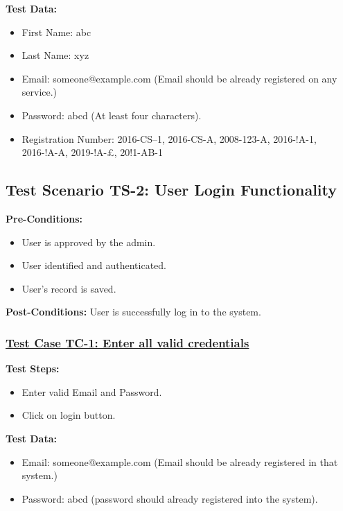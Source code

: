 \textbf{Test Data:}
\begin{itemize}

\item First Name: abc
\item Last Name: xyz
\item Email: someone@example.com (Email should be already registered on any service.)
\item Password: abcd (At least four characters).
\item Registration Number: 2016-CS--1, 2016-CS-A, 2008-123-A, 2016-!A-1, 2016-!A-A, 2019-!A-£, 20!1-AB-1

\end{itemize}


\subsection{Test Scenario TS-2: User Login Functionality}
\textbf{Pre-Conditions: } 
\begin{itemize}

\item User is approved by the admin.
\item User identified and authenticated.
\item User's record is saved.

\end{itemize}

\textbf{Post-Conditions: } User is successfully log in to the system.
\subsubsection{\underline{Test Case TC-1: Enter all valid credentials}}
\textbf{Test Steps:}
\begin{itemize}

\item Enter valid Email and Password.
\item Click on login button.

\end{itemize}

\textbf{Test Data:}
\begin{itemize}

\item Email: someone@example.com (Email should be already registered in that system.)
\item Password: abcd (password should already registered into the system).

\end{itemize}

